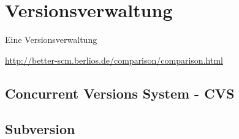 \section{Versionsverwaltung}
Eine Versionsverwaltung 


\url{http://better-scm.berlios.de/comparison/comparison.html}
\citep[Versionsverwaltung]{Wikipedia2005}

		\subsection{Concurrent Versions System - CVS}
		\subsection{Subversion}
		